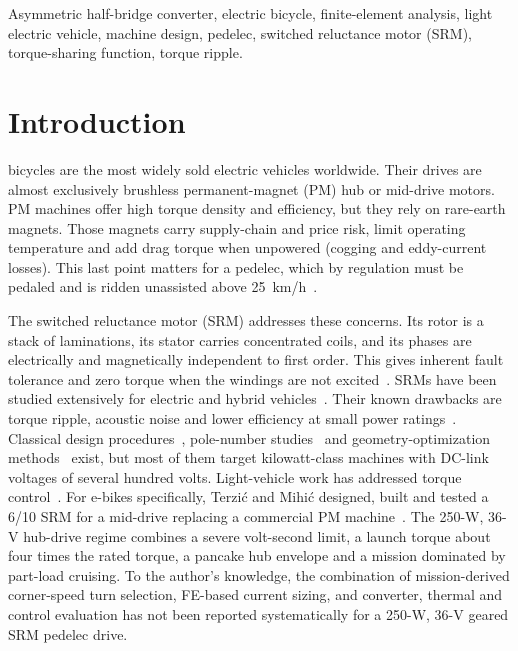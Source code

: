 \documentclass[journal]{IEEEtran}
\begin{document}
\begin{IEEEkeywords}
Asymmetric half-bridge converter, electric bicycle, finite-element analysis,
light electric vehicle, machine design, pedelec, switched reluctance motor (SRM),
torque-sharing function, torque ripple.
\end{IEEEkeywords}

\section{Introduction}
 bicycles are the most widely sold electric vehicles
worldwide. Their drives are almost exclusively brushless permanent-magnet (PM)
hub or mid-drive motors. PM machines offer high torque density and efficiency,
but they rely on rare-earth magnets. Those magnets carry supply-chain and price
risk, limit operating temperature and add drag torque when unpowered (cogging
and eddy-current losses). This last point matters for a pedelec, which by
regulation must be pedaled and is ridden unassisted above 25~km/h~\cite{en15194}.

The switched reluctance motor (SRM) addresses these concerns. Its rotor is a
stack of laminations, its stator carries concentrated coils, and its phases are
electrically and magnetically independent to first order. This gives inherent
fault tolerance and zero torque when the windings are not
excited~\cite{miller1993,krishnan2001}. SRMs have been studied extensively for
electric and hybrid vehicles~\cite{rahman2000,xue2010,bostanci2017,jiang2017,lan2021,bilgin2019}.
Their known drawbacks are torque ripple, acoustic noise and lower efficiency at
small power ratings~\cite{husain2002,vujicic2012,fang2021}. Classical design
procedures~\cite{krishnan1988,radun1995,vijayakumar2008}, pole-number
studies~\cite{bilgin2012} and geometry-optimization methods~\cite{abdalmagid2022}
exist, but most of them target kilowatt-class machines with DC-link voltages of
several hundred volts. Light-vehicle work has addressed torque
control~\cite{hamouda2020}. For e-bikes specifically, Terzi\'c and Mihi\'c
designed, built and tested a 6/10 SRM for a mid-drive replacing a commercial PM
machine~\cite{terzic2022}. The \mbox{250-W}, 36-V hub-drive regime combines a
severe volt-second limit, a launch torque about four times the rated torque, a
pancake hub envelope and a mission dominated by part-load cruising. To the
author's knowledge, the combination of mission-derived corner-speed turn
selection, FE-based current sizing, and converter, thermal and control
evaluation has not been reported systematically for a 250-W, 36-V geared SRM
pedelec drive.
\end{document}
